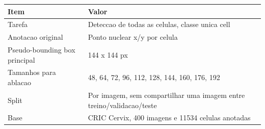 \begin{tabular}{ll}
\toprule
Item & Valor \\
\midrule
Tarefa & Deteccao de todas as celulas, classe unica cell \\
Anotacao original & Ponto nuclear x/y por celula \\
Pseudo-bounding box principal & 144 x 144 px \\
Tamanhos para ablacao & 48, 64, 72, 96, 112, 128, 144, 160, 176, 192 \\
Split & Por imagem, sem compartilhar uma imagem entre treino/validacao/teste \\
Base & CRIC Cervix, 400 imagens e 11534 celulas anotadas \\
\bottomrule
\end{tabular}
